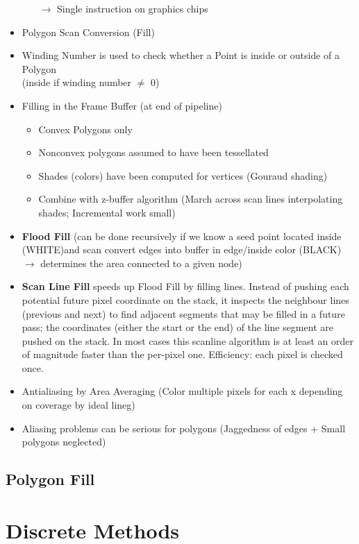 \documentclass[11pt,a4paper]{article}
\begin{document}
\begin{itemize}
\begin{itemize}
					$\rightarrow$ Single instruction on graphics chips
				\end{itemize}
			\item Polygon Scan Conversion (Fill)
			\item Winding Number is used to check whether a Point is inside or outside of a Polygon\\
				(inside if winding number $\ne$ 0)
			\item Filling in the Frame Buffer (at end of pipeline)
				\begin{itemize}
					\item Convex Polygons only
					\item Nonconvex polygons assumed to have been tessellated
					\item Shades (colors) have been computed for vertices (Gouraud shading)
					\item Combine with z-buffer algorithm (March across scan lines interpolating shades; Incremental work small)
				\end{itemize}
			\item \textbf{Flood Fill} (can be done recursively if we know a seed point located inside (WHITE)and scan convert edges into buffer in edge/inside color
			(BLACK) $\rightarrow$ determines the area connected to a given node)
			\item \textbf{Scan Line Fill} speeds up Flood Fill by filling lines. Instead of pushing each potential future pixel coordinate on the stack, it inspects the neighbour lines (previous and next) to find adjacent segments that may be filled in a future pass; the coordinates (either the start or the end) of the line segment are pushed on the stack. In most cases this scanline algorithm is at least an order of magnitude faster than the per-pixel one.
			Efficiency: each pixel is checked once.
			\item Antialiasing by Area Averaging (Color multiple pixels for each x depending on coverage by ideal lineg)
			\item Aliasing problems can be serious for polygons (Jaggedness of edges + Small polygons neglected)
		\end{itemize}
	\subsection{Polygon Fill}
	
\section{Discrete Methods}
\end{document}
